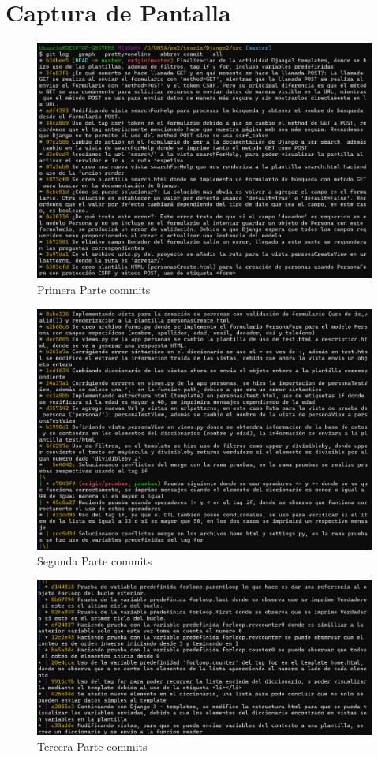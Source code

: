 \documentclass{article}
\begin{document}
	\section{Captura de Pantalla}
    \begin{figure}[H]
      \centering
      \includegraphics[width=1\textwidth, keepaspectratio]{img/commits1.png}
      \caption{Primera Parte commits}
    \end{figure}
    \newpage
    \begin{figure}[H]
      \centering
      \includegraphics[width=1\textwidth, keepaspectratio]{img/commits2.png}
      \caption{Segunda Parte commits}
    \end{figure}
    \begin{figure}[H]
      \centering
      \includegraphics[width=1\textwidth, keepaspectratio]{img/commits3.png}
      \caption{Tercera Parte commits}
    \end{figure}
\end{document}
